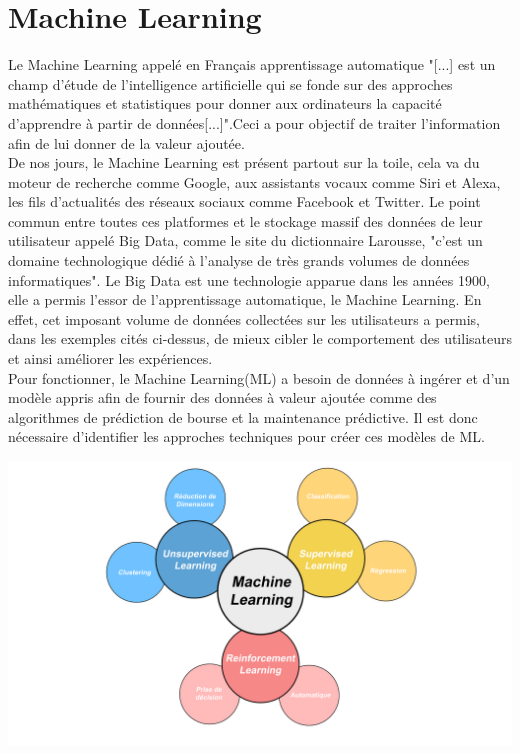 \documentclass[12pt,a4paper,french]{report}
\begin{document}
\setcounter{page}{1} %

\chapter{Machine Learning}
Le Machine Learning appelé en Français apprentissage automatique "[...] est un champ d'étude de l'intelligence artificielle qui se fonde sur des approches mathématiques et statistiques pour donner aux ordinateurs la capacité d'apprendre à partir de données[...]".Ceci a pour objectif de traiter l'information afin de lui donner de la valeur ajoutée.\\

De nos jours, le Machine Learning est présent partout sur la toile, cela va du moteur de recherche comme Google, aux assistants vocaux comme Siri et Alexa, les fils d'actualités des réseaux sociaux comme Facebook et Twitter. Le point commun entre toutes ces platformes et le stockage massif des données de leur utilisateur appelé Big Data, comme le site du dictionnaire Larousse, "c'est un domaine technologique dédié à l'analyse de très grands volumes de données informatiques". Le Big Data est une technologie apparue dans les années 1900, elle a permis l'essor de l'apprentissage automatique, le Machine Learning. En effet, cet imposant volume de données collectées sur les utilisateurs a permis, dans les exemples cités ci-dessus, de mieux cibler le comportement des utilisateurs et ainsi améliorer les expériences.\\

Pour fonctionner, le Machine Learning(ML) a besoin de données à ingérer et d'un modèle appris afin de fournir des données à valeur ajoutée comme des algorithmes de prédiction de bourse et la maintenance prédictive. Il est donc nécessaire d'identifier les approches techniques pour créer ces modèles de ML.\\

\begin{center}
	\includegraphics[scale=0.2]{ML_vignette}
	\label{fig1}
\end{center}
\end{document}
